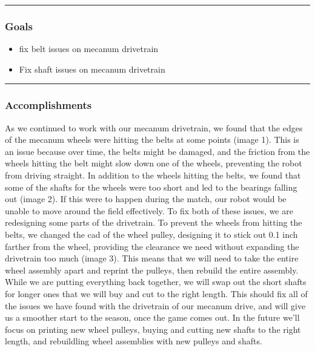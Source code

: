 \noindent\hfil\rule{\textwidth}{.4pt}\hfil
\subsubsection*{Goals}
\begin{itemize}
    \item fix belt issues on mecanum drivetrain
	\item Fix shaft issues on mecanum drivetrain

\end{itemize} 

\noindent\hfil\rule{\textwidth}{.4pt}\hfil

\subsubsection*{Accomplishments}
As we continued to work with our mecanum drivetrain, we found that the edges of the mecanum wheels were hitting the belts at some points (image 1). This is an issue because over time, the belts might be damaged, and the friction from the wheels hitting the belt might slow down one of the wheels, preventing the robot from driving straight. In addition to the wheels hitting the belts, we found that some of the shafts for the wheels were too short and led to the bearings falling out (image 2). If this were to happen during the match, our robot would be unable to move around the field effectively. To fix both of these issues, we are redesigning some parts of the drivetrain. To prevent the wheels from hitting the belts, we changed the cad of the wheel pulley, designing it to stick out 0.1 inch farther from the wheel, providing the clearance we need without expanding the drivetrain too much (image 3). This means that we will need to take the entire wheel assembly apart and reprint the pulleys, then rebuild the entire assembly. While we are putting everything back together, we will swap out the short shafts for longer ones that we will buy and cut to the right length. This should fix all of the issues we have found with the drivetrain of our mecanum drive, and will give us a smoother start to the season, once the game comes out. In the future we'll focus on printing new wheel pulleys,
buying and cutting new shafts to the right length, and 
rebuildling wheel assemblies with new pulleys and shafts.



